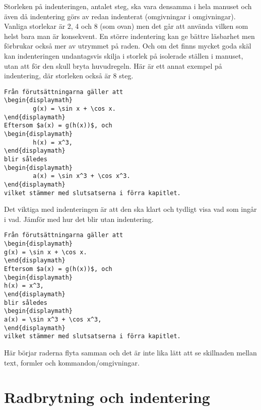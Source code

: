 \documentclass[a4paper,12pt]{article}
\begin{document}
Storleken på indenteringen, antalet steg, ska vara densamma i hela
manuset och även då indentering görs av redan indenterat (omgivningar
i omgivningar). Vanliga storlekar är 2, 4 och 8 (som ovan) men det går att
använda vilken som helst bara man är konsekvent. En större
indentering kan ge bättre läsbarhet men förbrukar också mer av
utrymmet på raden. Och om det finns mycket goda skäl kan indenteringen
undantagsvis skilja i storlek på isolerade ställen i manuset, utan att
för den skull bryta huvudregeln. Här är
ett annat exempel på indentering, där storleken också
är 8 steg.
%
\begin{lstlisting}
Från förutsättningarna gäller att
\begin{displaymath}
        g(x) = \sin x + \cos x. 
\end{displaymath}
Eftersom $a(x) = g(h(x))$, och 
\begin{displaymath}
        h(x) = x^3,
\end{displaymath}
blir således 
\begin{displaymath}
        a(x) = \sin x^3 + \cos x^3.
\end{displaymath}
vilket stämmer med slutsatserna i förra kapitlet.
\end{lstlisting}
%
Det viktiga med indenteringen är att den ska klart och tydligt visa
vad som ingår i vad. Jämför med hur det blir utan indentering. 
%
\begin{lstlisting}
Från förutsättningarna gäller att
\begin{displaymath}
g(x) = \sin x + \cos x. 
\end{displaymath}
Eftersom $a(x) = g(h(x))$, och 
\begin{displaymath}
h(x) = x^3,
\end{displaymath}
blir således 
\begin{displaymath}
a(x) = \sin x^3 + \cos x^3,
\end{displaymath}
vilket stämmer med slutsatserna i förra kapitlet.
\end{lstlisting}
%
Här börjar raderna flyta samman och det är inte lika lätt att se
skillnaden mellan text, formler och kommandon/omgivningar. 


\section{Radbrytning och indentering}
\end{document}
